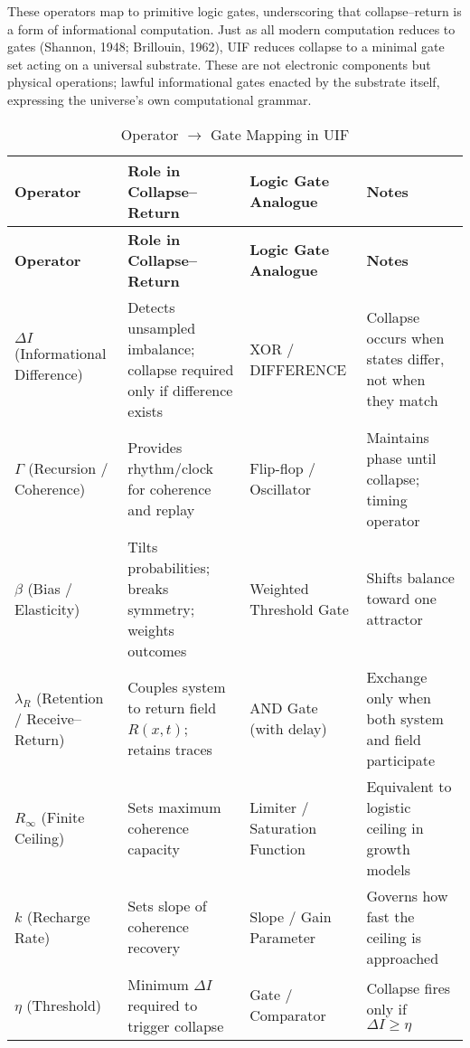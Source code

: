 These operators map to primitive logic gates, underscoring that collapse--return is a form of informational computation. Just as all modern computation reduces to gates (Shannon, 1948; Brillouin, 1962), UIF reduces collapse to a minimal gate set acting on a universal substrate. These are not electronic components but physical operations; lawful informational gates enacted by the substrate itself, expressing the universe’s own computational grammar.
\vspace{0.5\baselineskip}  
\begin{longtable}{@{} L{0.20\textwidth} L{0.36\textwidth} L{0.18\textwidth} L{0.26\textwidth} @{}}
\caption{Operator $\rightarrow$ Gate Mapping in UIF}\label{tab:1-operator-gate}\\
\toprule
\textbf{Operator} & \textbf{Role in Collapse--Return} & \textbf{Logic Gate Analogue} & \textbf{Notes} \\
\midrule
\endfirsthead
\toprule
\textbf{Operator} & \textbf{Role in Collapse--Return} & \textbf{Logic Gate Analogue} & \textbf{Notes} \\
\midrule
\endhead
\bottomrule
\endfoot

$\Delta I$ (Informational Difference) & Detects unsampled imbalance; collapse required only if difference exists & XOR / DIFFERENCE & Collapse occurs when states differ, not when they match \\
$\Gamma$ (Recursion / Coherence) & Provides rhythm/clock for coherence and replay & Flip-flop / Oscillator & Maintains phase until collapse; timing operator \\
$\beta$ (Bias / Elasticity) & Tilts probabilities; breaks symmetry; weights outcomes & Weighted Threshold Gate & Shifts balance toward one attractor \\
$\lambda_R$ (Retention / Receive--Return) & Couples system to return field $R(x,t)$; retains traces & AND Gate (with delay) & Exchange only when both system and field participate \\
$R_\infty$ (Finite Ceiling) & Sets maximum coherence capacity & Limiter / Saturation Function & Equivalent to logistic ceiling in growth models \\
$k$ (Recharge Rate) & Sets slope of coherence recovery & Slope / Gain Parameter & Governs how fast the ceiling is approached \\
$\eta$ (Threshold) & Minimum $\Delta I$ required to trigger collapse & Gate / Comparator & Collapse fires only if $\Delta I \ge \eta$ \\

\end{longtable}
\vspace{0.5\baselineskip}  

